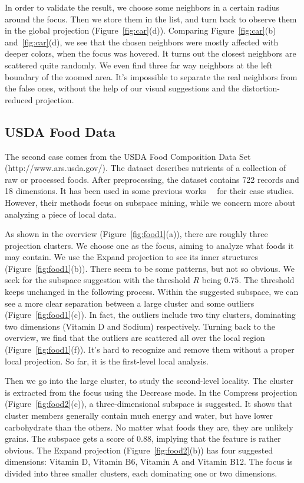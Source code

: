In order to validate the result, we choose some neighbors in a certain radius around the focus. Then we store them in the list, and turn back to observe them in the global projection (Figure~\ref{fig:car}(d)). Comparing Figure~\ref{fig:car}(b) and~\ref{fig:car}(d), we see that the chosen neighbors were mostly affected with deeper colors, when the focus was hovered. It turns out the closest neighbors are scattered quite randomly. We even find three far way neighbors at the left boundary of the zoomed area. It's impossible to separate the real neighbors from the false ones, without the help of our visual suggestions and the distortion-reduced projection.

\subsection{USDA Food Data}
\label{case:food}
The second case comes from the USDA Food Composition Data Set (http://www.ars.usda.gov/).  The dataset describes nutrients of a collection of raw or processed foods. After preprocessing, the dataset contains 722 records and 18 dimensions. It has been used in some previous works~\cite{DBLP:conf/ieeevast/TatuMFBSSK12}~\cite{DBLP:journals/tvcg/YuanRWG13} for their case studies. However, their methods focus on subspace mining, while we concern more about analyzing a piece of local data.

As shown in the overview (Figure~\ref{fig:food1}(a)), there are roughly three projection clusters. We choose one as the focus, aiming to analyze what foods it may contain. We use the Expand projection to see its inner structures (Figure~\ref{fig:food1}(b)). There seem to be some patterns, but not so obvious. We seek for the subspace suggestion with the threshold $R$ being $0.75$. The threshold keeps unchanged in the following process. Within the suggested subspace, we can see a more clear separation between a large  cluster and some outliers (Figure~\ref{fig:food1}(c)). In fact, the outliers include two tiny clusters, dominating two dimensions (Vitamin D and Sodium) respectively. Turning back to the overview, we find that the outliers are scattered all over the local region (Figure~\ref{fig:food1}(f)). It's hard to recognize and remove them without a proper local projection. So far, it is the first-level local analysis.

Then we go into the large cluster, to study the second-level locality. The cluster is extracted from the focus using the Decrease mode. In the Compress projection (Figure~\ref{fig:food2}(c)), a three-dimensional subspace is suggested. It shows that cluster members generally contain much energy and water, but have lower carbohydrate than the others. No matter what foods they are, they are unlikely grains. The subspace gets a score of 0.88, implying that the feature is rather obvious. The Expand projection (Figure~\ref{fig:food2}(b)) has four suggested dimensions: Vitamin D, Vitamin B6, Vitamin A and Vitamin B12. The focus is divided into three smaller clusters, each dominating one or two dimensions.

